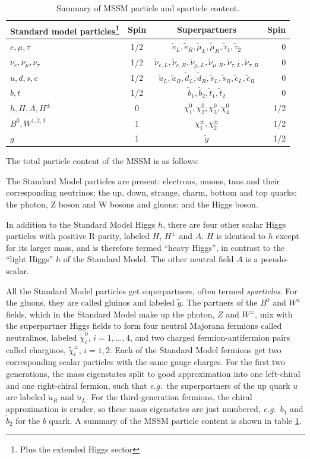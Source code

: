 \documentclass[twoside,english]{uiofysmaster}
\begin{document}
 \begin{table}[hbt]
 \centering
 	\begin{tabular}{l |c | c | r}
 		Standard model particles\footnote{Plus the extended Higgs sector} & Spin & Superpartners & Spin\\
 		\hline
 		$e, \mu, \tau$ & 1/2 & $\tilde e_L, \tilde e_R, \tilde \mu_L, \tilde \mu_R, \tilde \tau_1, \tilde \tau_2$ & 0\\
 		\hline
 		$\nu_e, \nu_\mu, \nu_\tau$ & 1/2 & $\tilde \nu_{e,L}, \tilde \nu_{e,R}, \tilde \nu_{\mu,L}, \tilde \nu_{\mu,R}, \tilde \nu_{\tau,L}, \tilde \nu_{\tau,R}$ & 0\\
 		\hline
 		$u, d, s, c$ & 1/2 & $\tilde u_L, \tilde u_R, \tilde d_L, \tilde d_R, \tilde s_L, \tilde s_R, \tilde c_L, \tilde c_R$ & 0\\
 		\hline
 		$b, t$ & 1/2 & $\tilde b_1, \tilde b_2, \tilde t_1, \tilde t_2$ & 0\\
 		\hline
 		$h, H, A, H^\pm$ & 0 & $\chi_1^0, \chi_2^0, \chi_3^0, \chi_4^0$ & 1/2\\
 		$B^0, W^{1,2,3}$ & 1 & $\chi_1^\pm, \chi_2^\pm$ & 1/2\\
 		\hline
 		$g$ & 1 & $\tilde g$ & 1/2
 	\end{tabular}
 	\caption{Summary of MSSM particle and sparticle content.}
 	\label{table:MSSM_particles}
 \end{table}
The total particle content of the MSSM is as follows: 

The Standard Model particles are present: electrons, muons, taus and their corresponding neutrinos; the up, down, strange, charm, bottom and top quarks; the photon, Z boson and W bosons and gluons; and the Higgs boson. 

In addition to the Standard Model Higgs $h$, there are four other scalar Higgs particles with positive R-parity, labeled $H$, $H^\pm$ and $A$. $H$ is identical to $h$ except for its larger mass, and is therefore termed ``heavy Higgs'', in contrast to the ``light Higgs'' $h$ of the Standard Model. The other neutral field $A$ is a pseudo-scalar.

All the Standard Model particles get superpartners, often termed {\it sparticles}. For the gluons, they are called gluinos and labeled $\tilde g$. The partners of the $B^0$ and $W^a$ fields, which in the Standard Model make up the photon, $Z$ and $W^\pm$, mix with the superpartner Higgs fields to form four neutral Majorana fermions called neutralinos, labeled $\tilde\chi_i^0$, $i=1,...,4$, and two charged fermion-antifermion pairs called charginos, $\tilde\chi_i^\pm$, $i=1,2$. Each of the Standard Model fermions get two corresponding scalar particles with the same gauge charges. For the first two generations, the mass eigenstates split to good approximation into one left-chiral and one right-chiral fermion, such that {\it e.g.}\ the superpartners of the up quark $u$ are labeled $\tilde u_R$ and $\tilde u_L$. For the third-generation fermions, the chiral approximation is cruder, so these mass eigenstates are just numbered, {\it e.g.}\ $\tilde b_1$ and $\tilde b_2$ for the $b$ quark. A summary of the MSSM particle content is shown in table \ref{table:MSSM_particles}.
\end{document}
